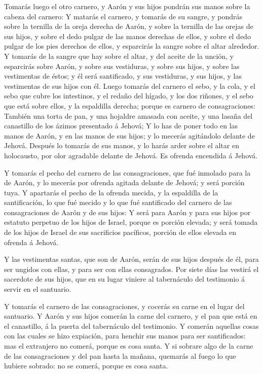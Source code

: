  Tomarás luego el otro carnero, y Aarón y sus hijos pondrán
sus manos sobre la cabeza del carnero:  Y matarás el
carnero, y tomarás de su sangre, y pondrás sobre la ternilla de la oreja
derecha de Aarón, y sobre la ternilla de las orejas de sus hijos, y
sobre el dedo pulgar de las manos derechas de ellos, y sobre el dedo
pulgar de los pies derechos de ellos, y esparcirás la sangre sobre el
altar alrededor.  Y tomarás de la sangre que hay sobre el
altar, y del aceite de la unción, y esparcirás sobre Aarón, y sobre sus
vestiduras, y sobre sus hijos, y sobre las vestimentas de éstos; y él
será santificado, y sus vestiduras, y sus hijos, y las vestimentas de
sus hijos con él.  Luego tomarás del carnero el sebo, y la
cola, y el sebo que cubre los intestinos, y el redaño del hígado, y los
dos riñones, y el sebo que está sobre ellos, y la espaldilla derecha;
porque es carnero de consagraciones:  También una torta de
pan, y una hojaldre amasada con aceite, y una lasaña del canastillo de
los ázimos presentado á Jehová;  Y lo has de poner todo en
las manos de Aarón, y en las manos de sus hijos; y lo mecerás agitándolo
delante de Jehová.  Después lo tomarás de sus manos, y lo
harás arder sobre el altar en holocausto, por olor agradable delante de
Jehová. Es ofrenda encendida á Jehová.

 Y tomarás el pecho del carnero de las consagraciones, que
fué inmolado para la de Aarón, y lo mecerás por ofrenda agitada delante
de Jehová; y será porción tuya.  Y apartarás el pecho de la
ofrenda mecida, y la espaldilla de la santificación, lo que fué mecido y
lo que fué santificado del carnero de las consagraciones de Aarón y de
sus hijos:  Y será para Aarón y para sus hijos por estatuto
perpetuo de los hijos de Israel, porque es porción elevada; y será
tomada de los hijos de Israel de sus sacrificios pacíficos, porción de
ellos elevada en ofrenda á Jehová.

 Y las vestimentas santas, que son de Aarón, serán de sus
hijos después de él, para ser ungidos con ellas, y para ser con ellas
consagrados.  Por siete días las vestirá el sacerdote de
sus hijos, que en su lugar viniere al tabernáculo del testimonio á
servir en el santuario.

 Y tomarás el carnero de las consagraciones, y cocerás su
carne en el lugar del santuario.  Y Aarón y sus hijos
comerán la carne del carnero, y el pan que está en el canastillo, á la
puerta del tabernáculo del testimonio.  Y comerán aquellas
cosas con las cuales se hizo expiación, para henchir sus manos para ser
santificados: mas el extranjero no comerá, porque es cosa santa.
 Y si sobrare algo de la carne de las consagraciones y del
pan hasta la mañana, quemarás al fuego lo que hubiere sobrado: no se
comerá, porque es cosa santa.

